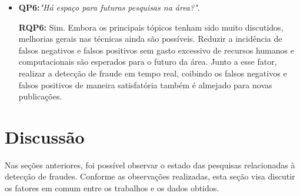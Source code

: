 \documentclass[smallextended]{svjour3}
\begin{document}
\begin{itemize}
	\
	\item \textbf{QP6:}\textit{"Há espaço para futuras pesquisas na área?"}.
	
	\textbf{RQP6:} Sim. Embora os principais tópicos tenham sido muito discutidos, melhorias gerais nas técnicas ainda são possíveis. Reduzir a incidência de falsos negativos e falsos positivos sem gasto excessivo de recursos humanos e computacionais são esperados para o futuro da área. Junto a esse fator, realizar a detecção de fraude em tempo real, coibindo os falsos negativos e falsos positivos de maneira satisfatória também é almejado para novas publicações.
	
\end{itemize}

\section{Discussão}
\label{sec:5}

Nas seções anteriores, foi possível observar o estado das pesquisas relacionadas à detecção de fraudes. Conforme as observações realizadas, esta seção visa discutir os fatores em comum entre os trabalhos e os dados obtidos.
\end{document}
